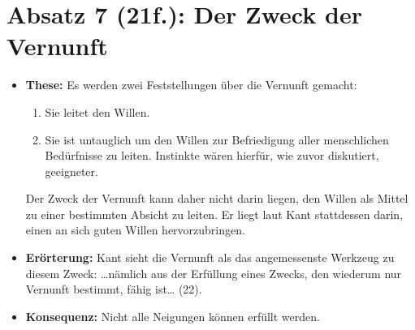 \documentclass{llncs}
\begin{document}
\section*{Absatz 7 (21f.): Der Zweck der Vernunft}

\begin{itemize}
	\item \textbf{These:} Es werden zwei Feststellungen über die Vernunft gemacht:
		\begin{enumerate}
			\item Sie leitet den Willen.
			\item Sie ist untauglich um den Willen zur Befriedigung aller menschlichen Bedürfnisse zu leiten.
			 	Instinkte wären hierfür, wie zuvor diskutiert, geeigneter.
		\end{enumerate}
		Der Zweck der Vernunft kann daher nicht darin liegen, den Willen als Mittel zu einer bestimmten Absicht zu leiten.
		Er liegt laut Kant stattdessen darin, einen an sich guten Willen hervorzubringen.
	\item \textbf{Erörterung:} Kant sieht die Vernunft als das angemessenste Werkzeug zu diesem Zweck:
		\glqq{}\ldots nämlich aus der Erfüllung eines Zwecks, den wiederum nur Vernunft bestimmt, fähig ist\ldots\grqq{} (22).
	\item \textbf{Konsequenz:} Nicht alle Neigungen können erfüllt werden.
\end{itemize}
\end{document}
